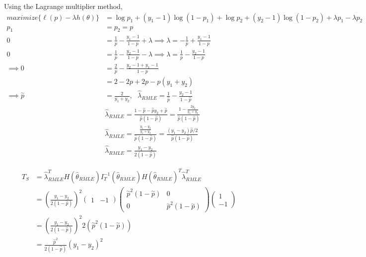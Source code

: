 \documentclass[
  letterpaper,
  DIV=11,
  numbers=noendperiod]{scrreprt}
\begin{document}
Using the Lagrange multiplier method, \[\begin{aligned}
maximize \{\ell(p)  -\lambda h(\theta)\}
& = \log p_1 + (y_1-1)\log(1-p_1) +\log p_2+ (y_2-1)\log(1-p_2) + \lambda p_1 - \lambda p_2\\
p_1 &= p_2  = p\\
0 &= \frac{1} {p} -\frac{y_1-1}{1-p} + \lambda \implies \lambda = -\frac{1} {p} +\frac{y_1-1}{1-p}\\
0 &= \frac{1} {p} -\frac{y_2-1}{1-p} -\lambda \implies \lambda = \frac{1} {p} -\frac{y_2-1}{1-p} \\
\implies 0&= \frac{2} {p} -\frac{y_2-1+y_1-1}{1-p}\\
&= 2-2p +2p -p(y_1+y_2) \\
\implies \overset \sim p &= \frac 2 {y_1+y_2},~~~ \hat \lambda_{RMLE} = \frac{1} {\overset \sim p} -\frac{y_2-1}{1-\overset \sim p}\\
& \hat \lambda_{RMLE} =  \frac{1- \overset \sim p - \overset \sim p y_2+ \overset \sim p}{\overset \sim p (1-\overset \sim p)}=  \frac{1 - \frac {2y_2} {y_1+y_2}}{\overset \sim p (1-\overset \sim p)} \\
&\hat \lambda_{RMLE}=  \frac{\frac {y_1-y_2} {y_1+y_2}}{\overset \sim p (1-\overset \sim p)}=\frac {(y_1-y_2) \overset \sim p /2}{\overset \sim p (1-\overset \sim p)}\\
&\hat \lambda_{RMLE}=  \frac{y_1-y_2}{2 (1-\overset \sim p)}
\end{aligned}\]

\[\begin{aligned}
T_S &= \hat \lambda_{RMLE}^T H(\hat \theta_{RMLE})I_T^{-1}(\hat \theta_{RMLE})  H(\hat \theta_{RMLE})^T\hat \lambda_{RMLE}^T \\
&= \left(\frac{y_1-y_2}{2 (1-\overset \sim p)}\right)^2  \begin{pmatrix} 1 & -1 \end{pmatrix} \begin{pmatrix} \overset \sim p^2(1-\overset \sim p)& 0 \\ 0&\overset \sim p^2(1-\overset \sim p) \end{pmatrix} \begin{pmatrix} 1 \\ -1 \end{pmatrix} \\
&= \left(\frac{y_1-y_2}{2 (1-\overset \sim p)}\right)^2  2 (\overset \sim p^2(1-\overset \sim p)) \\
&= \frac{\overset \sim p^2}{2 (1-\overset \sim p)}(y_1-y_2)^2
\end{aligned}\]
\end{document}
